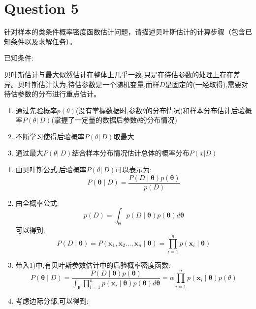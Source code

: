 \documentclass[homework]{IEEEtran}
\begin{document}
\section{Question 5}
\begin{CJK}{UTF8}{gkai}
    针对样本的类条件概率密度函数估计问题，请描述贝叶斯估计的计算步骤（包含已知条件以及求解任务）。 \par
    已知条件: \par
            贝叶斯估计与最大似然估计在整体上几乎一致,只是在待估参数的处理上存在差异。贝叶斯估计认为,待估参数是一个随机变量,而样$D$是固定的(一经取得),需要对待估参数的分布进行重点估计。\par
    \begin{enumerate}[求解任务:] \par
        \item 通过先验概率$p(\theta)$(没有掌握数据时,参数$\theta$的分布情况)和样本分布估计后验概率$P(\theta\vert\ D)$(掌握了一定量的数据后参数$\theta$的分布情况)
        \item 不断学习使得后验概率$P(\theta\vert\ D)$取最大
        \item 通过最大$P(\theta\vert\ D)$结合样本分布情况估计总体的概率分布$P\left( x \vert D \right)$
        \end{enumerate}\par
    \begin{enumerate}[计算步骤:]
        \item 由贝叶斯公式,后验概率$P(\theta\vert\ D)$可以表示为: $$
        P(\boldsymbol{\theta} \mid D)=\frac{P(D \mid \boldsymbol{\theta}) p(\boldsymbol{\theta})}{p(D)}
        $$
        \item 由全概率公式:$$
        p(D)=\int_{\boldsymbol{\theta}} p(D \mid \boldsymbol{\theta}) p(\boldsymbol{\theta}) d \boldsymbol{\theta}
        $$
        可以得到:$$
        P(D \mid \boldsymbol{\theta})=P\left(\mathbf{x}_1, \mathbf{x}_2 \ldots, \mathbf{x}_n \mid \boldsymbol{\theta}\right)=\prod_{i=1}^n p\left(\mathbf{x}_i \mid \boldsymbol{\theta}\right)
        $$
        \item 带入1)中,有贝叶斯参数估计中的后验概率密度函数:$$
        P(\boldsymbol{\theta} \mid D)=\frac{P(D \mid \boldsymbol{\theta}) p(\boldsymbol{\theta})}{
            \int_{\boldsymbol{\theta}} \prod_{i=1}^n p\left(\mathbf{x}_i \mid \boldsymbol{\theta}\right) p(\boldsymbol{\theta}) d \boldsymbol{\theta}}
            = \alpha\prod_{i=1}^n p\left(\mathbf{x}_i \mid \boldsymbol{\theta}\right) p(\theta)
        $$
        \item 考虑边际分部,可以得到:
        \begin{equation}

\end{equation}
\end{enumerate}
\end{CJK}
\end{document}
